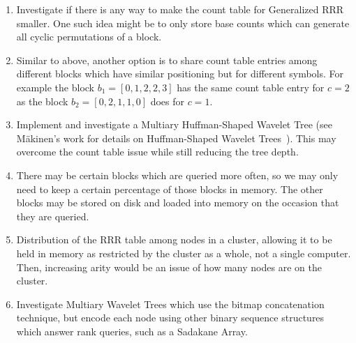 \begin{enumerate}
\item
	Investigate if there is any way to make the count table for Generalized RRR 
	smaller. One such idea might be to only store base counts which can
	generate all cyclic permutations of a block.
	
\item
	Similar to above, another option is to share count table entries among 
	different blocks which have similar positioning but for different symbols. 
	For example the block $b_1 = [0, 1, 2, 2, 3]$ has the same count table entry 
	for $c = 2$ as the block $b_2 = [0, 2, 1, 1, 0]$ does for $c = 1$.
	
\item
	Implement and investigate a Multiary Huffman-Shaped Wavelet Tree (see 
	M\"{a}kinen's work for details on Huffman-Shaped Wavelet
	Trees~\cite{makinen2005}). This may
	overcome the count table issue while still reducing the tree depth.

\item
	There may be certain blocks which are queried more often, so we may only
	need to keep a certain percentage of those blocks in memory. The other 
	blocks may be stored on disk and loaded into memory on the occasion that 
	they are queried.

\item
	Distribution of the RRR table among nodes in a cluster, allowing it to be
	held in memory as restricted by the cluster as a whole, not a single
	computer. Then, increasing arity would be an issue of how many nodes are
	on the cluster.

\item
	Investigate Multiary Wavelet Trees which use the bitmap concatenation 
	technique, but encode each node using other binary sequence structures which 
	answer rank queries, such as a Sadakane Array.

\end{enumerate}
